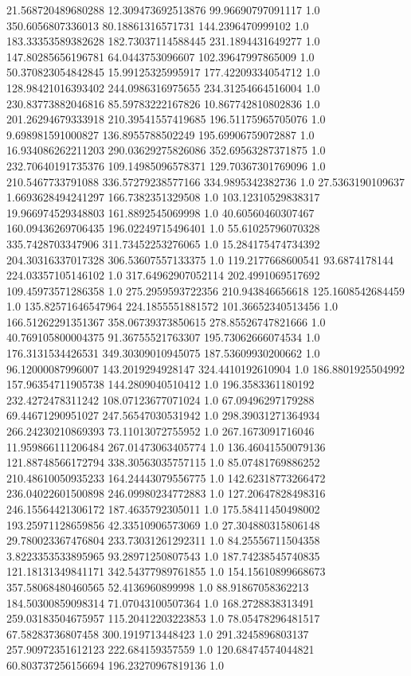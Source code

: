 21.568720489680288	12.309473692513876	99.96690797091117	1.0
350.6056807336013	80.18861316571731	144.2396470999102	1.0
183.33353589382628	182.73037114588445	231.1894431649277	1.0
147.80285656196781	64.0443753096607	102.39647997865009	1.0
50.370823054842845	15.99125325995917	177.42209334054712	1.0
128.98421016393402	244.0986316975655	234.31254664516004	1.0
230.83773882046816	85.59783222167826	10.867742810802836	1.0
201.26294679333918	210.39541557419685	196.51175965705076	1.0
9.698981591000827	136.8955788502249	195.69906759072887	1.0
16.934086262211203	290.03629275826086	352.69563287371875	1.0
232.70640191735376	109.14985096578371	129.70367301769096	1.0
210.5467733791088	336.57279238577166	334.9895342382736	1.0
27.5363190109637	1.6693628494241297	166.7382351329508	1.0
103.12310529838317	19.966974529348803	161.8892545069998	1.0
40.60560460307467	160.09436269706435	196.02249715496401	1.0
55.61025796070328	335.7428703347906	311.73452253276065	1.0
15.284175474734392	204.30316337017328	306.53607557133375	1.0
119.2177668600541	93.6874178144	224.03357105146102	1.0
317.64962907052114	202.4991069517692	109.45973571286358	1.0
275.2959593722356	210.943846656618	125.1608542684459	1.0
135.82571646547964	224.1855551881572	101.36652340513456	1.0
166.51262291351367	358.06739373850615	278.85526747821666	1.0
40.769105800004375	91.36755521763307	195.73062666074534	1.0
176.3131534426531	349.30309010945075	187.53609930200662	1.0
96.12000087996007	143.2019294928147	324.4410192610904	1.0
186.8801925504992	157.96354711905738	144.2809040510412	1.0
196.3583361180192	232.4272478311242	108.07123677071024	1.0
67.09496297179288	69.44671290951027	247.56547030531942	1.0
298.39031271364934	266.24230210869393	73.11013072755952	1.0
267.1673091716046	11.959866111206484	267.01473063405774	1.0
136.46041550079136	121.88748566172794	338.30563035757115	1.0
85.07481769886252	210.48610050935233	164.24443079556775	1.0
142.62318773266472	236.04022601500898	246.09980234772883	1.0
127.20647828498316	246.15564421306172	187.4635792305011	1.0
175.58411450498002	193.25971128659856	42.33510906573069	1.0
27.304880315806148	29.780023367476804	233.73031261292311	1.0
84.25556711504358	3.8223353533895965	93.28971250807543	1.0
187.74238545740835	121.18131349841171	342.54377989761855	1.0
154.15610899668673	357.58068480460565	52.4136960899998	1.0
88.91867058362213	184.50300859098314	71.07043100507364	1.0
168.2728838313491	259.03183504675957	115.20412203223853	1.0
78.05478296481517	67.58283736807458	300.1919713448423	1.0
291.3245896803137	257.90972351612123	222.684159357559	1.0
120.68474574044821	60.803737256156694	196.23270967819136	1.0
